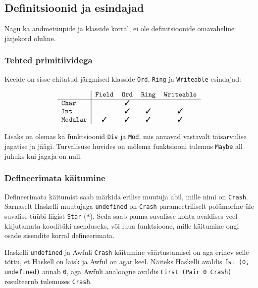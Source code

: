 \documentclass[12pt]{article}
\def\linnuke{\ding{51}}
\begin{document}
    \subsection{Definitsioonid ja esindajad}
      Nagu ka andmetüüpide ja klasside korral, ei ole definitsioonide omavaheline järjekord oluline.
      \subsubsection{Tehted primitiividega}
        Keelde on sisse ehitatud järgmised klasside \verb!Ord!, \verb!Ring! ja \verb!Writeable! esindajad:

        \begin{equation*}
          \begin{tabular}{l|cccc}
                           & \verb!Field! & \verb!Ord! & \verb!Ring! & \verb!Writeable! \\\hline
            \verb!Char!    &              & \linnuke   &             &                  \\
            \verb!Int!     &              & \linnuke   & \linnuke    & \linnuke         \\
            \verb!Modular! & \linnuke     & \linnuke   & \linnuke    & \linnuke
          \end{tabular}
        \end{equation*}

        Lisaks on olemas ka funktsioonid \verb!Div! ja \verb!Mod!, mis annavad vastavalt täisarvulise jagatise ja jäägi. Turvalisuse huvides on mõlema funktsiooni tulemus \verb!Maybe! all juhuks kui jagaja on null.
      \subsubsection{Defineerimata käitumine}
        Defineerimata käitumist saab märkida erilise muutuja abil, mille nimi on \verb!Crash!. Sarnaselt Haskelli muutujaga \verb!undefined! on \verb!Crash! parameetriliselt polümorfne üle suvalise tüübi liigist \verb!Star! (\verb!*!). Seda saab panna suvalisse kohta avaldises veel kirjutamata kooditüki asenduseks, või luua funktsioone, mille käitumine ongi osade sisendite korral defineerimata.

        Haskelli \verb!undefined! ja Awfuli \verb!Crash! käitumine väärtustamisel on aga erinev selle tõttu, et Haskell on laisk ja Awful on agar keel. Näiteks Haskelli avaldis \verb!fst (0, undefined)! annab \verb!0!, aga Awfuli analoogne avaldis \verb!First (Pair 0 Crash)! resulteerub tulemuses \verb!Crash!.
\end{document}
